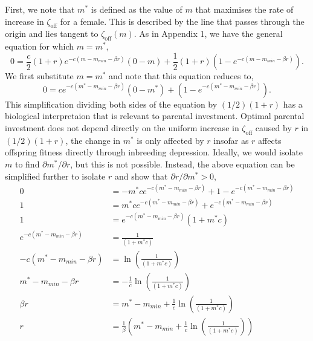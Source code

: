 \documentclass[12pt]{article}
\begin{document}
First, we note that $m^{*}$ is defined as the value of $m$ that maximises the rate of increase in $\zeta_{\textrm{off}}$ for a female. This is described by the line that passes through the origin and lies tangent to $\zeta_{\textrm{off}}(m)$. As in Appendix 1, we have the general equation for which $m=m^{*}$,
\begin{equation}
0 = \frac{c}{2} \left(1+r\right)e^{-c\left(m-m_{min}-\beta r\right)}\left(0-m\right) + \frac{1}{2}\left(1+r\right)\left(1-e^{-c\left(m-m_{min}-\beta r\right)}\right).
\end{equation}
We first substitute $m=m^{*}$ and note that this equation reduces to,
\begin{equation}
0 = c e^{-c\left(m^{*}-m_{min}-\beta r\right)}\left(0-m^{*}\right) + \left(1-e^{-c\left(m^{*}-m_{min}-\beta r\right)}\right). 
\end{equation}
This simplification dividing both sides of the equation by $(1/2)(1+r)$ has a biological interpretaion that is relevant to parental investment. Optimal parental investment does not depend directly on the uniform increase in $\zeta_{\textrm{off}}$ caused by $r$ in $(1/2)(1+r)$, the change in $m^{*}$ is only affected by $r$ insofar as $r$ affects offspring fitness directly through inbreeding depression. Ideally, we would isolate $m$ to find $\partial m^{*} / \partial r$, but this is not possible. Instead, the above equation can be simplified further to isolate $r$ and show that $\partial r / \partial m^{*} > 0$,
\begin{align*}
0 &= -m^{*} c e^{-c\left(m^{*}-m_{min}-\beta r\right)} + 1-e^{-c\left(m^{*}-m_{min}-\beta r\right)} \\
1 &= m^{*} c e^{-c\left(m^{*}-m_{min}-\beta r\right)} + e^{-c\left(m^{*}-m_{min}-\beta r\right)} \\
1 &= e^{-c\left(m^{*}-m_{min}-\beta r\right)} \left(1 + m^{*} c\right) \\
e^{-c\left(m^{*}-m_{min}-\beta r\right)} &= \frac{1}{\left(1 + m^{*} c\right)} \\
-c\left(m^{*}-m_{min}-\beta r\right) &= \ln\left(\frac{1}{\left(1 + m^{*} c\right)}\right) \\
m^{*}-m_{min}-\beta r &= -\frac{1}{c}\ln\left(\frac{1}{\left(1 + m^{*} c\right)}\right) \\
\beta r &= m^{*} - m_{min} + \frac{1}{c}\ln\left(\frac{1}{\left(1 + m^{*} c\right)}\right) \\
r &= \frac{1}{\beta}\left(m^{*} - m_{min} + \frac{1}{c}\ln\left(\frac{1}{\left(1 + m^{*} c\right)}\right)\right)
\end{align*}
\end{document}
